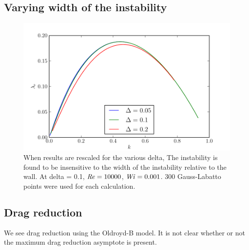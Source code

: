 \documentclass{jfm}
\newcommand\Wi{\mbox{\textit{Wi}}}
\newcommand\Rey{\mbox{\textit{Re}}}  %
\begin{document}
\subsection{Varying width of the instability}

\begin{figure}
    \includegraphics[width=\textwidth]{high_Re_vary_delta}
    \caption{When results are rescaled for the various delta, The instability is found to be insensitive to the width of the instability relative to the wall. At delta = 0.1, $\Rey = 10000$, $\Wi = 0.001$. 300 Gauss-Labatto points were used for each calculation.}
    \label{fig:delta_dispersion}
\end{figure}

\subsection{Drag reduction}

We see drag reduction using the Oldroyd-B model. It is not clear whether or not the maximum drag reduction asymptote is present.
\end{document}
